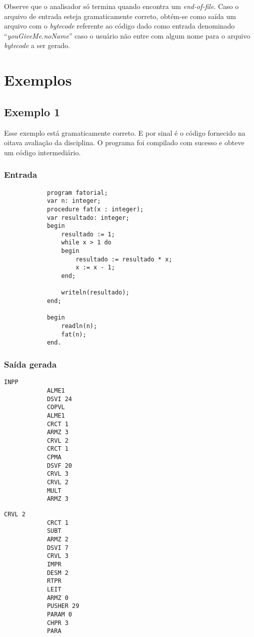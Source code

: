\documentclass{article}
\begin{document}
	Observe que o analisador só termina quando encontra um \emph{end-of-file}. Caso o arquivo de entrada esteja gramaticamente correto, obtém-se como saída um arquivo com o \emph{bytecode} referente ao código dado como entrada denominado ``\emph{youGiveMe.noName}'' caso o usuário não entre com algum nome para o arquivo \emph{bytecode} a ser gerado.

\section{Exemplos} %
\label{sec:exemplos}
	
	\subsection{Exemplo 1} %
	\label{sub:exemplo_1}
		Esse exemplo está gramaticamente correto. E por sinal é o código fornecido na oitava avaliação da disciplina. 
		O programa foi compilado com sucesso e obteve um código intermediário.

		\subsubsection*{Entrada} %
		\label{ssub:entrada}
		
		\begin{lstlisting}
			program fatorial;
			var n: integer;
			procedure fat(x : integer);
			var resultado: integer;
			begin
				resultado := 1;
				while x > 1 do
				begin
					resultado := resultado * x;
					x := x - 1;
				end;

				writeln(resultado);
			end;

			begin
				readln(n);
				fat(n);
			end.
		\end{lstlisting}


		\subsubsection*{Saída gerada} %
		\label{ssub:sa_da_gerada}
			\begin{center}
			\begin{minipage}[t]{0.4\textwidth}
			\begin{lstlisting}[firstnumber=0]
			INPP
			ALME1
			DSVI 24
			COPVL
			ALME1
			CRCT 1
			ARMZ 3
			CRVL 2
			CRCT 1
			CPMA
			DSVF 20
			CRVL 3
			CRVL 2
			MULT
			ARMZ 3
			\end{lstlisting}
			\end{minipage}
			\begin{minipage}[t]{0.4\textwidth}
			\begin{lstlisting}[firstnumber=15]
			CRVL 2
			CRCT 1
			SUBT
			ARMZ 2
			DSVI 7
			CRVL 3
			IMPR
			DESM 2
			RTPR
			LEIT
			ARMZ 0
			PUSHER 29
			PARAM 0
			CHPR 3
			PARA
			\end{lstlisting}
			\end{minipage}
			\end{center}
\end{document}
